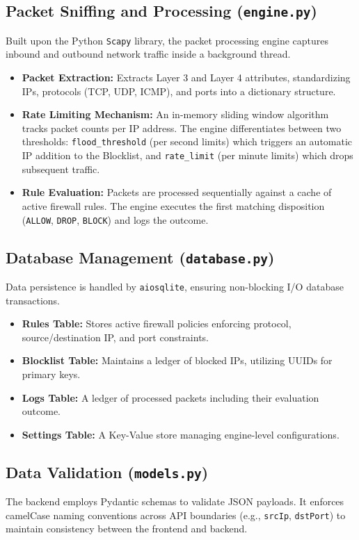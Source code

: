 \documentclass[12pt, a4paper]{article}
\begin{document}
\subsection{Packet Sniffing and Processing (\texttt{engine.py})}
Built upon the Python \texttt{Scapy} library, the packet processing engine captures inbound and outbound network traffic inside a background thread.
\begin{itemize}
    \item \textbf{Packet Extraction:} Extracts Layer 3 and Layer 4 attributes, standardizing IPs, protocols (TCP, UDP, ICMP), and ports into a dictionary structure.
    \item \textbf{Rate Limiting Mechanism:} An in-memory sliding window algorithm tracks packet counts per IP address. The engine differentiates between two thresholds: \texttt{flood\_threshold} (per second limits) which triggers an automatic IP addition to the Blocklist, and \texttt{rate\_limit} (per minute limits) which drops subsequent traffic.
    \item \textbf{Rule Evaluation:} Packets are processed sequentially against a cache of active firewall rules. The engine executes the first matching disposition (\texttt{ALLOW}, \texttt{DROP}, \texttt{BLOCK}) and logs the outcome.
\end{itemize}

\subsection{Database Management (\texttt{database.py})}
Data persistence is handled by \texttt{aiosqlite}, ensuring non-blocking I/O database transactions.
\begin{itemize}
    \item \textbf{Rules Table:} Stores active firewall policies enforcing protocol, source/destination IP, and port constraints.
    \item \textbf{Blocklist Table:} Maintains a ledger of blocked IPs, utilizing UUIDs for primary keys.
    \item \textbf{Logs Table:} A ledger of processed packets including their evaluation outcome.
    \item \textbf{Settings Table:} A Key-Value store managing engine-level configurations.
\end{itemize}

\subsection{Data Validation (\texttt{models.py})}
The backend employs Pydantic schemas to validate JSON payloads. It enforces camelCase naming conventions across API boundaries (e.g., \texttt{srcIp}, \texttt{dstPort}) to maintain consistency between the frontend and backend.
\end{document}
